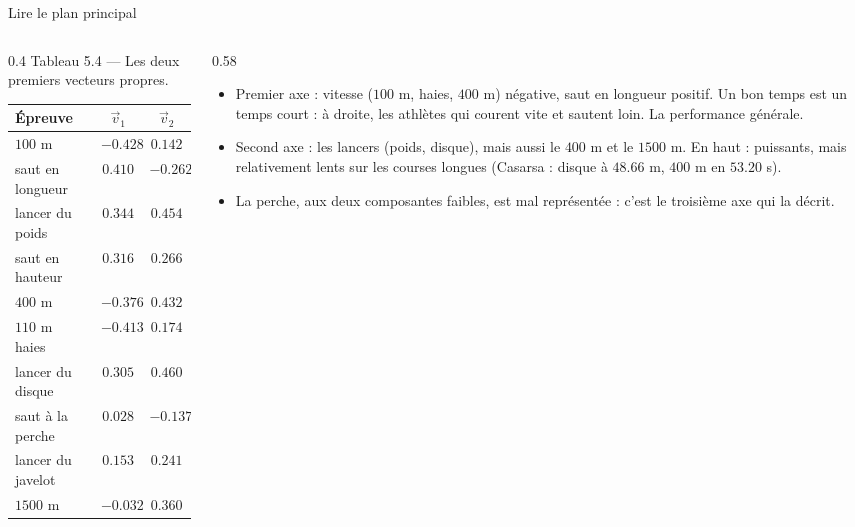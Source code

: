 \begin{frame}{Lire le plan principal}
  \begin{columns}[c]
    \begin{column}{0.4\textwidth}
      \scriptsize Tableau 5.4 --- Les deux premiers vecteurs propres.
      \begin{center}
        \scriptsize
        \begin{tabular}{lcc}
          \toprule
          Épreuve & $\vec v_1$ & $\vec v_2$ \\
          \midrule
          $100$ m & $-\num{0.428}$ & $\num{0.142}$ \\
          saut en longueur & $\num{0.410}$ & $-\num{0.262}$ \\
          lancer du poids & $\num{0.344}$ & $\num{0.454}$ \\
          saut en hauteur & $\num{0.316}$ & $\num{0.266}$ \\
          $400$ m & $-\num{0.376}$ & $\num{0.432}$ \\
          $110$ m haies & $-\num{0.413}$ & $\num{0.174}$ \\
          lancer du disque & $\num{0.305}$ & $\num{0.460}$ \\
          saut à la perche & $\num{0.028}$ & $-\num{0.137}$ \\
          lancer du javelot & $\num{0.153}$ & $\num{0.241}$ \\
          $1500$ m & $-\num{0.032}$ & $\num{0.360}$ \\
          \bottomrule
        \end{tabular}
      \end{center}
    \end{column}
    \begin{column}{0.58\textwidth}
      \small
      \begin{itemize}
        \item Premier axe : vitesse ($100$ m, haies, $400$ m) négative, saut
          en longueur positif. Un bon temps est un temps court : à droite,
          les athlètes qui courent vite et sautent loin. La performance
          générale.
        \item Second axe : les lancers (poids, disque), mais aussi le $400$ m
          et le $1500$ m. En haut : puissants, mais relativement lents sur
          les courses longues (Casarsa : disque à $\num{48.66}$ m,
          $400$ m en $\num{53.20}$ s).
        \item La perche, aux deux composantes faibles, est mal représentée :
          c'est le troisième axe qui la décrit.
      \end{itemize}
    \end{column}
  \end{columns}
\end{frame}

